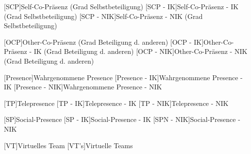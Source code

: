 \begin{acronym}
	[SCP]{Self-Co-Präsenz (Grad Selbstbeteiligung)}
	[SCP - IK]{Self-Co-Präsenz - IK (Grad Selbstbeteiligung)}
	[SCP - NIK]{Self-Co-Präsenz - NIK (Grad Selbstbeteiligung)}	
	
	[OCP]{Other-Co-Präsenz (Grad Beteiligung d. anderen)}
	[OCP - IK]{Other-Co-Präsenz - IK (Grad Beteiligung d. anderen)}
	[OCP - NIK]{Other-Co-Präsenz - NIK (Grad Beteiligung d. anderen)}	
	
	[Presence]{Wahrgenommene Presence}
	[Presence - IK]{Wahrgenommene Presence - IK}
	[Presence - NIK]{Wahrgenommene Presence - NIK}
	
	[TP]{Telepresence}
	[TP - IK]{Telepresence - IK}
	[TP - NIK]{Telepresence - NIK}	
	
	[SP]{Social-Presence}
	[SP - IK]{Social-Presence - IK}
	[SPN - NIK]{Social-Presence - NIK}
	
	[VT]{Virtuelles Team}
	[VT's]{Virtuelle Teams}
\end{acronym}
